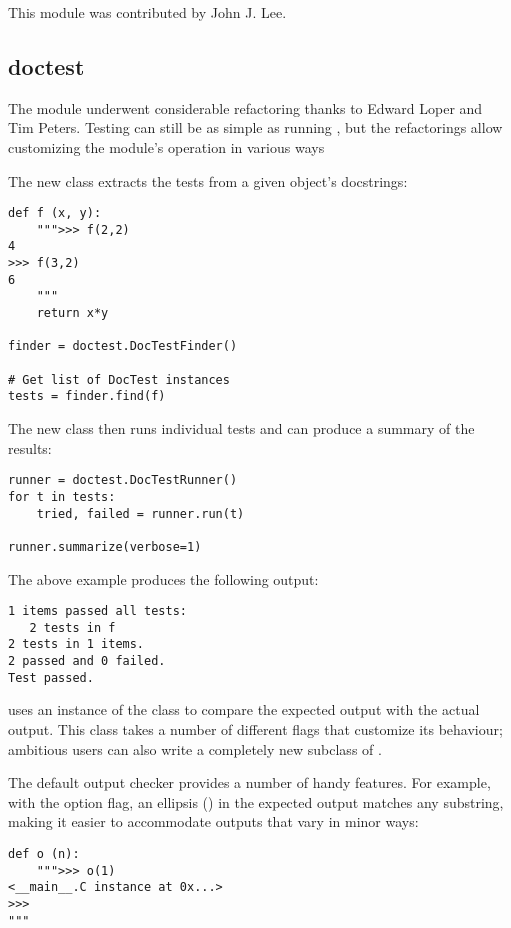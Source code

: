 \documentclass{howto}
\begin{document}
This module was contributed by John J. Lee.


\subsection{doctest}

The  module underwent considerable refactoring thanks
to Edward Loper and Tim Peters.  Testing can still be as simple as
running , but the refactorings allow
customizing the module's operation in various ways

The new  class extracts the tests from a given 
object's docstrings:

\begin{verbatim}
def f (x, y):
    """>>> f(2,2)
4
>>> f(3,2)
6
    """
    return x*y

finder = doctest.DocTestFinder()

# Get list of DocTest instances
tests = finder.find(f)
\end{verbatim}

The new  class then runs individual tests and can
produce a summary of the results:

\begin{verbatim}
runner = doctest.DocTestRunner()
for t in tests:
    tried, failed = runner.run(t)
    
runner.summarize(verbose=1)
\end{verbatim}

The above example produces the following output:

\begin{verbatim}
1 items passed all tests:
   2 tests in f
2 tests in 1 items.
2 passed and 0 failed.
Test passed.
\end{verbatim}

 uses an instance of the 
class to compare the expected output with the actual output.  This
class takes a number of different flags that customize its behaviour;
ambitious users can also write a completely new subclass of
.

The default output checker provides a number of handy features.
For example, with the  option flag,
an ellipsis () in the expected output matches any substring, 
making it easier to accommodate outputs that vary in minor ways:

\begin{verbatim}
def o (n):
    """>>> o(1)
<__main__.C instance at 0x...>
>>>
"""
\end{verbatim}
\end{document}
